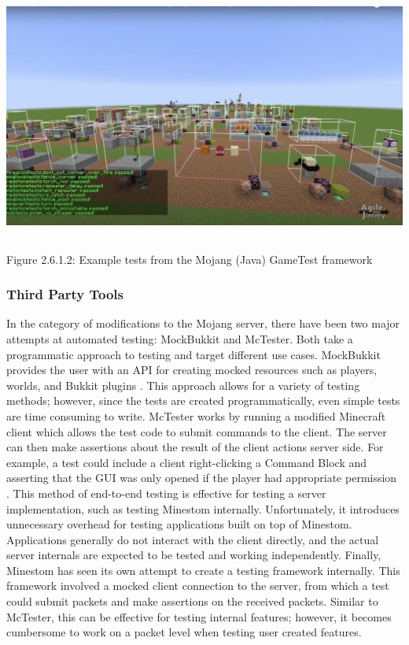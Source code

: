 \documentclass{article}
\begin{document}
\begin{onehalfspacing}
\includegraphics[width=6.01042in,height=3.20833in]{media/media/image7.png}

Figure 2.6.1.2: Example tests from the Mojang (Java) GameTest framework

\subsubsection{Third Party Tools}

In the category of modifications to the Mojang server, there have been
two major attempts at automated testing: MockBukkit and McTester. Both
take a programmatic approach to testing and target different use cases.
MockBukkit provides the user with an API for creating mocked resources
such as players, worlds, and Bukkit plugins \parencite{mockbukkit}. 
This approach allows for a variety of testing methods; however, since the
tests are created programmatically, even simple tests are time consuming
to write. McTester works by running a modified Minecraft client which
allows the test code to submit commands to the client. The server can
then make assertions about the result of the client actions server side.
For example, a test could include a client right-clicking a Command
Block and asserting that the GUI was only opened if the player had
appropriate permission \parencite{mctester}. 
This method of end-to-end testing is effective for testing a server implementation, such as testing
Minestom internally. Unfortunately, it introduces unnecessary overhead
for testing applications built on top of Minestom. Applications
generally do not interact with the client directly, and the actual
server internals are expected to be tested and working independently.
Finally, Minestom has seen its own attempt to create a testing framework
internally. This framework involved a mocked client connection to the
server, from which a test could submit packets and make assertions on
the received packets. Similar to McTester, this can be effective for
testing internal features; however, it becomes cumbersome to work on a
packet level when testing user created features.


\end{onehalfspacing}
\end{document}
